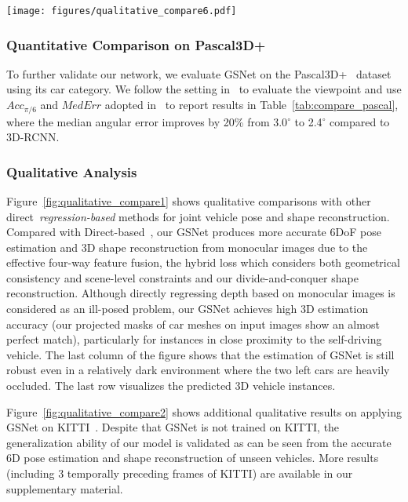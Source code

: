 \documentclass[runningheads]{llncs}
\begin{document}
\begin{figure*}[!t]
	\centering
	\texttt{[image: figures/qualitative\_compare6.pdf]}
	\caption{Cross-dataset generalization of GSNet on KITTI~\cite{geiger2012we} dataset. The first row are the input images and the second row are our reconstructed 3D car meshes projected onto the original image. Additional results are shown in our supplementary material.}
	\label{fig:qualitative_compare2}
\end{figure*}


\subsubsection{Quantitative Comparison on Pascal3D+}
To further validate our network, we evaluate GSNet on the Pascal3D+~\cite{xiang2014beyond} dataset using its car category. We follow the setting in~\cite{kundu20183d,mousavian20173d} to evaluate the viewpoint and use $Acc_{\pi/6}$ and $MedErr$ adopted in~\cite{mousavian20173d,tulsiani2015viewpoints} to report results in Table~\ref{tab:compare_pascal}, where the median angular error improves by 20\% from 3.0$^{\circ}$ to 2.4$^{\circ}$ compared to 3D-RCNN.

\subsubsection{Qualitative Analysis}
\label{sec:qualitative_analysis}
Figure~\ref{fig:qualitative_compare1} shows qualitative comparisons with other direct~\textit{regression-based} methods for joint vehicle pose and shape reconstruction. Compared with Direct-based~\cite{song2019apollocar3d}, our GSNet produces more accurate 6DoF pose estimation and 3D shape reconstruction from monocular images due to the effective four-way feature fusion, the hybrid loss which considers both geometrical consistency and scene-level constraints and our divide-and-conquer shape reconstruction. Although directly regressing depth based on monocular images is considered as an ill-posed problem, our GSNet achieves high 3D estimation accuracy (our projected masks of car meshes on input images show an almost perfect match), particularly for instances in close proximity to the self-driving vehicle.
The last column of the figure shows that the estimation of GSNet is still robust even in a relatively dark environment where the two left cars are heavily occluded. The last row visualizes the predicted 3D vehicle instances.

Figure~\ref{fig:qualitative_compare2} shows additional qualitative results on applying GSNet on KITTI~\cite{geiger2012we}. Despite that GSNet is not trained on KITTI, the generalization ability of our model is validated as can be seen from the accurate 6D pose estimation and shape reconstruction of unseen vehicles. More results (including 3 temporally preceding frames of KITTI) are available in our supplementary material. 
\end{document}

